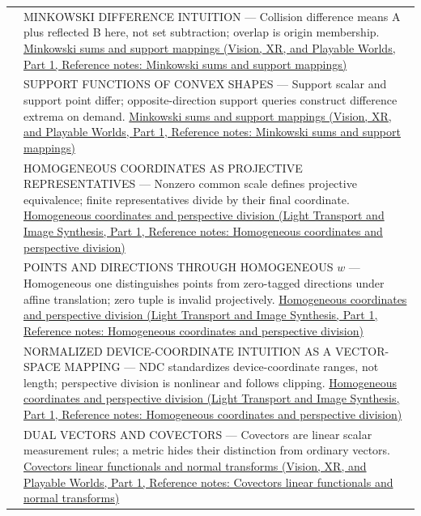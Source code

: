 {\begin{longtable}[]{@{}
  >{\raggedright\arraybackslash}p{}
  >{\raggedright\arraybackslash}p{}@{}}
576 & MINKOWSKI DIFFERENCE INTUITION --- Collision difference means A plus reflected B here, not set subtraction; overlap is origin membership. \href{../07-Vision-XR-and-Playable-Worlds-P01/main.pdf\#appendix-215ac7099a82}{Minkowski sums and support mappings (Vision, XR, and Playable Worlds, Part 1, Reference notes: Minkowski sums and support mappings)} \\
577 & SUPPORT FUNCTIONS OF CONVEX SHAPES --- Support scalar and support point differ; opposite-direction support queries construct difference extrema on demand. \href{../07-Vision-XR-and-Playable-Worlds-P01/main.pdf\#appendix-215ac7099a82}{Minkowski sums and support mappings (Vision, XR, and Playable Worlds, Part 1, Reference notes: Minkowski sums and support mappings)} \\
578 & HOMOGENEOUS COORDINATES AS PROJECTIVE REPRESENTATIVES --- Nonzero common scale defines projective equivalence; finite representatives divide by their final coordinate. \href{../04-Light-Transport-and-Image-Synthesis-P01/main.pdf\#appendix-cb3b26862282}{Homogeneous coordinates and perspective division (Light Transport and Image Synthesis, Part 1, Reference notes: Homogeneous coordinates and perspective division)} \\
579 & POINTS AND DIRECTIONS THROUGH HOMOGENEOUS \(w\) --- Homogeneous one distinguishes points from zero-tagged directions under affine translation; zero tuple is invalid projectively. \href{../04-Light-Transport-and-Image-Synthesis-P01/main.pdf\#appendix-cb3b26862282}{Homogeneous coordinates and perspective division (Light Transport and Image Synthesis, Part 1, Reference notes: Homogeneous coordinates and perspective division)} \\
580 & NORMALIZED DEVICE-COORDINATE INTUITION AS A VECTOR-SPACE MAPPING --- NDC standardizes device-coordinate ranges, not length; perspective division is nonlinear and follows clipping. \href{../04-Light-Transport-and-Image-Synthesis-P01/main.pdf\#appendix-cb3b26862282}{Homogeneous coordinates and perspective division (Light Transport and Image Synthesis, Part 1, Reference notes: Homogeneous coordinates and perspective division)} \\
581 & DUAL VECTORS AND COVECTORS --- Covectors are linear scalar measurement rules; a metric hides their distinction from ordinary vectors. \href{../07-Vision-XR-and-Playable-Worlds-P01/main.pdf\#appendix-46da295c6787}{Covectors linear functionals and normal transforms (Vision, XR, and Playable Worlds, Part 1, Reference notes: Covectors linear functionals and normal transforms)} \\

\end{longtable}}
